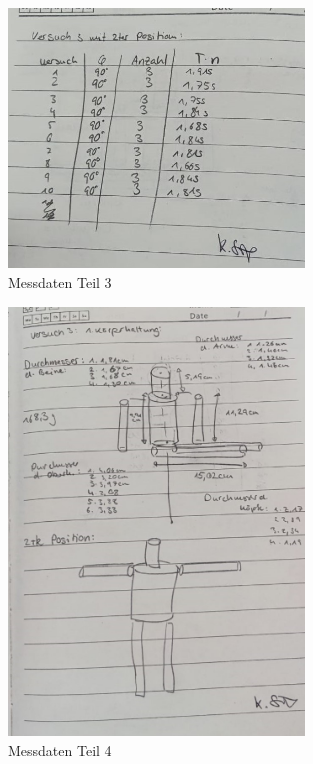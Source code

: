 \begin{figure}
  \centering
  \includegraphics[width=0.7\textwidth]{index3.jpg}
  \caption{Messdaten Teil 3}
  \label{fig:M1}
\end{figure}
\begin{figure}
  \centering
  \includegraphics[width=0.7\textwidth]{index4.jpg}
  \caption{Messdaten Teil 4}
  \label{fig:M1}
\end{figure}
